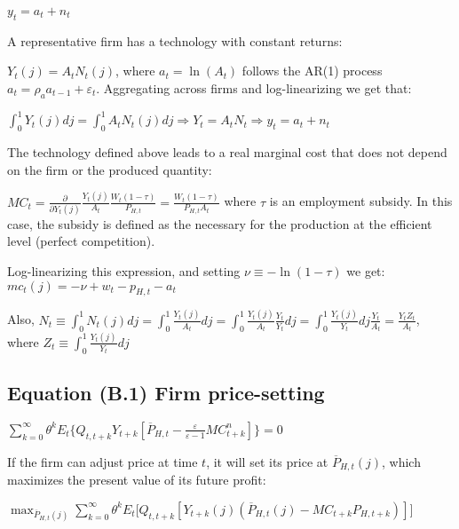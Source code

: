 \documentclass[
]{article}
\begin{document}
\(y_t=a_t+n_t\)

\vspace{8pt}

A representative firm has a technology with constant returns:

\(Y_t(j) = A_t N_t(j)\), where \(a_t = \ln(A_t)\) follows the AR(1)
process \(a_t = \rho_a a_{t-1} + \varepsilon_t\). Aggregating across
firms and log-linearizing we get that:

\(\displaystyle \int^1_0 Y_t(j) dj = \int^1_0 A_t N_t(j) dj \Rightarrow Y_t = A_t N_t \Rightarrow y_t = a_t + n_t\)

The technology defined above leads to a real marginal cost that does not
depend on the firm or the produced quantity:

\(\displaystyle MC_t = \frac{\partial}{\partial Y_t(j)} \frac{Y_t(j)}{A_t} \frac{W_t(1-\tau)}{P_{H,t}} =\frac{W_t(1-\tau)}{P_{H,t} A_t}\)
where \(\tau\) is an employment subsidy. In this case, the subsidy is
defined as the necessary for the production at the efficient level
(perfect competition).

Log-linearizing this expression, and setting \(\nu \equiv -\ln(1-\tau)\)
we get: \(mc_t(j) = -\nu + w_t - p_{H,t} - a_t\)

Also,
\(\displaystyle N_t \equiv \int_0^1 N_t(j)dj = \int_0^1\frac{Y_t(j)}{A_t}dj=\int_0^1\frac{Y_t(j)}{A_t}\frac{Y_t}{Y_t}dj=\int_0^1\frac{Y_t(j)}{Y_t}dj\frac{Y_t}{A_t}=\frac{Y_t Z_t}{A_t}\),
where \(\displaystyle Z_t \equiv \int_0^1\frac{Y_t(j)}{Y_t}dj\)

\vspace{12pt}

\hypertarget{equation-b.1-firm-price-setting}{%
\subsection{Equation (B.1) Firm
price-setting}\label{equation-b.1-firm-price-setting}}

\(\displaystyle \sum_{k=0}^\infty \theta^kE_t \bigg\{ Q_{t,t+k} Y_{t+k } \left[ \overline{P}_{H,t}-\frac{\varepsilon}{\varepsilon-1} MC_{t+k}^n \right] \bigg\} = 0\)

\vspace{8pt}

If the firm can adjust price at time \(t\), it will set its price at
\(\overline P_{H,t} (j)\), which maximizes the present value of its
future profit:

\(\displaystyle \max_{\overline P_{H,t}(j)} \sum^\infty_{k=0} \theta^k E_t \big[ Q_{t, t+k}[Y_{t+k}(j) (\overline P_{H,t}(j) - MC_{t+k} P_{H,t+k})] \big]\)
\end{document}
